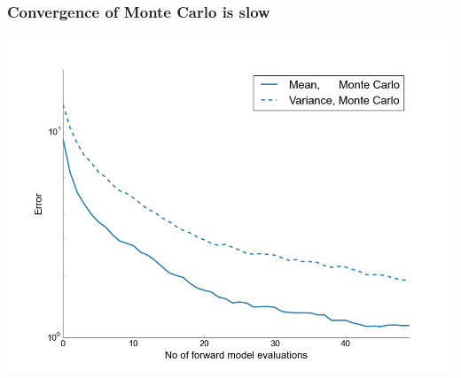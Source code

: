 \documentclass[handout]{beamer}
\newcommand{\E}[1]{\mbox{E}\!\left(#1\right)}
\newcommand{\Var}[1]{\mbox{Var}\!\left(#1\right)}
\begin{document}

\begin{frame}
  \frametitle{Convergence of Monte Carlo is slow}
  \begin{center}
    \includegraphics[width=1\textwidth]{MC_convergence_2D.png}
  \end{center}
\end{frame}


\end{document}
